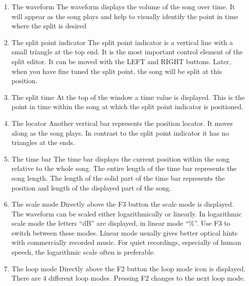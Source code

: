 \begin{itemize}
\begin{enumerate}
\item The waveform \newline
\newline
The waveform displays the volume of the song over time. It will appear
as the song plays and help to visually identify the point in time where
the split is desired
\item The split point indicator\newline
\newline
The split point indicator is a vertical line with a small triangle at
the top end. It is the most important control element of the split
editor. It can be moved with the LEFT and RIGHT buttons. Later, when
you have fine tuned the split point, the song will be split at this
position.
\item The split time\newline
\newline
At the top of the window a time value is displayed. This is the point in
time within the song at which the split point indicator is positioned. 
\item The locator\newline
\newline
Another vertical bar represents the position locator. It moves along as
the song plays. In contrast to the split point indicator it has no
triangles at the ends. 
\item The time bar\newline
\newline
The time bar displays the current position within the song relative to
the whole song. The entire length of the time bar represents the song
length. The length of the solid part of the time bar represents the position and length
of the displayed part of the song.
\item The scale mode\newline
\newline
Directly above the F3 button the scale mode is displayed. The waveform
can be scaled either logarithmically or linearly. In logarithmic scale
mode the letters ``dB'' are displayed, in linear mode ``\%''. Use F3 to
switch between these modes. Linear mode usually gives better optical
hints with commercially recorded music. For quiet recordings,
especially of human speech, the logarithmic scale often is preferable.
\item The loop mode \newline
\newline
Directly above the F2 button the loop mode icon is displayed. There are
4 different loop modes. Pressing F2 changes to the next loop mode. 


\end{enumerate}
\end{itemize}
